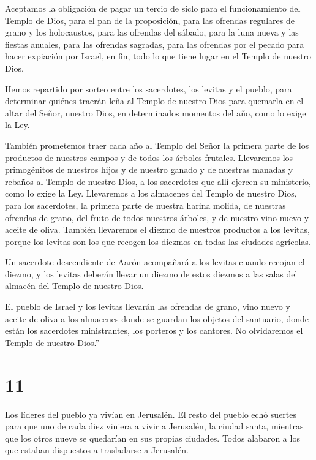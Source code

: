  Aceptamos la obligación de pagar un tercio de siclo para
el funcionamiento del Templo de Dios,  para el pan de la
proposición, para las ofrendas regulares de grano y los holocaustos,
para las ofrendas del sábado, para la luna nueva y las fiestas anuales,
para las ofrendas sagradas, para las ofrendas por el pecado para hacer
expiación por Israel, en fin, todo lo que tiene lugar en el Templo de
nuestro Dios.

 Hemos repartido por sorteo entre los sacerdotes, los
levitas y el pueblo, para determinar quiénes traerán leña al Templo de
nuestro Dios para quemarla en el altar del Señor, nuestro Dios, en
determinados momentos del año, como lo exige la Ley.

 También prometemos traer cada año al Templo del Señor la
primera parte de los productos de nuestros campos y de todos los árboles
frutales.  Llevaremos los primogénitos de nuestros hijos y
de nuestro ganado y de nuestras manadas y rebaños al Templo de nuestro
Dios, a los sacerdotes que allí ejercen su ministerio, como lo exige la
Ley.  Llevaremos a los almacenes del Templo de nuestro
Dios, para los sacerdotes, la primera parte de nuestra harina molida, de
nuestras ofrendas de grano, del fruto de todos nuestros árboles, y de
nuestro vino nuevo y aceite de oliva. También llevaremos el diezmo de
nuestros productos a los levitas, porque los levitas son los que recogen
los diezmos en todas las ciudades agrícolas.

 Un sacerdote descendiente de Aarón acompañará a los
levitas cuando recojan el diezmo, y los levitas deberán llevar un diezmo
de estos diezmos a las salas del almacén del Templo de nuestro Dios.

 El pueblo de Israel y los levitas llevarán las ofrendas de
grano, vino nuevo y aceite de oliva a los almacenes donde se guardan los
objetos del santuario, donde están los sacerdotes ministrantes, los
porteros y los cantores. No olvidaremos el Templo de nuestro Dios.''

\hypertarget{section-10}{%
\section{11}\label{section-10}}

 Los líderes del pueblo ya vivían en Jerusalén. El resto del
pueblo echó suertes para que uno de cada diez viniera a vivir a
Jerusalén, la ciudad santa, mientras que los otros nueve se quedarían en
sus propias ciudades.  Todos alabaron a los que estaban
dispuestos a trasladarse a Jerusalén.

